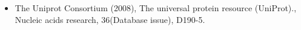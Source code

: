 \begin{otherlanguage}{british}
\begin{itemize}[leftmargin=*]
\item[]{
The Uniprot Consortium (2008), The universal protein resource (UniProt).,
Nucleic acids research, 36(Database issue), D190-5.
}

\end{itemize}






\end{otherlanguage}